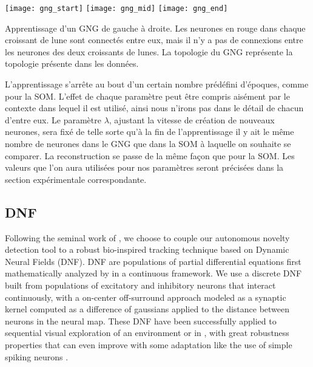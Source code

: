 	\begin{figureth}
		\texttt{[image: gng\_start]}
		\texttt{[image: gng\_mid]}
		\texttt{[image: gng\_end]}
		\caption[Apprentissage de GNG]{Apprentissage d'un GNG de gauche à droite. Les neurones en rouge dans chaque croissant de lune sont connectés entre eux, mais il n'y a pas de connexions entre les neurones des deux croissants de lunes. La topologie du GNG représente la topologie présente dans les données.\footnotemark}\label{fig:gng}
	\end{figureth}

	L'apprentissage s'arrête au bout d'un certain nombre prédéfini d'époques, comme pour la SOM. L'effet de chaque paramètre peut être compris aisément par le contexte dans lequel il est utilisé, ainsi nous n'irons pas dans le détail de chacun d'entre eux. Le paramètre $\lambda$, ajustant la vitesse de création de nouveaux neurones, sera fixé de telle sorte qu'à la fin de l'apprentissage il y ait le même nombre de neurones dans le GNG que dans la SOM à laquelle on souhaite se comparer. La reconstruction se passe de la même façon que pour la SOM. Les valeurs que l'on aura utilisées pour nos paramètres seront précisées dans la section expérimentale correspondante.

	\subsection{DNF}\label{sec:sota:dnf}


	Following the seminal work of \cite{Fix:dnf:2011}, we choose to couple our autonomous novelty detection tool to a robust bio-inspired tracking technique based on Dynamic Neural Fields (DNF). DNF are populations of partial differential equations first mathematically analyzed by \cite{amari:dnf:1977} in a continuous framework. We use a discrete DNF built from populations of excitatory and inhibitory neurons that interact continuously, with a on-center off-surround approach modeled as a synaptic kernel computed as a difference of gaussians applied to the distance between neurons in the neural map. These DNF have been successfully applied to sequential visual exploration of an environment \cite{Fix:dnf:2011} or in \cite{rougier:attention:2005}, with great robustness properties that can even improve with some adaptation like the use of simple spiking neurons \cite{vazquez:dnf:2011}. 

